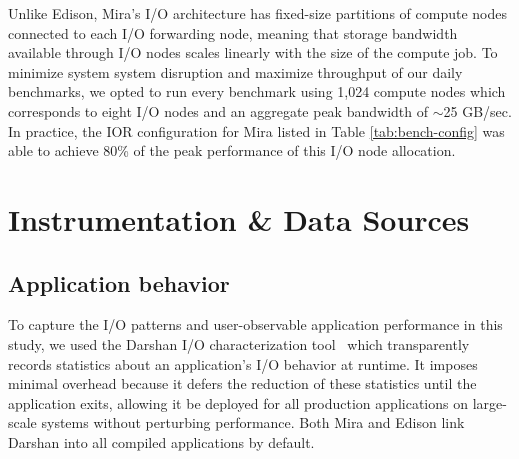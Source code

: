 Unlike Edison, Mira's I/O architecture has fixed-size partitions of compute nodes connected to each I/O forwarding node, 
meaning that storage bandwidth available through I/O nodes scales linearly with the size of the compute job.
To minimize system system disruption and maximize throughput of our daily benchmarks, we opted to run every benchmark using 1,024 compute nodes which 
corresponds to eight I/O nodes and an aggregate peak bandwidth of $\sim$25 GB/sec.
In practice, the IOR configuration for Mira listed in Table \ref{tab:bench-config} was able to achieve 80\% of the peak performance of this I/O node allocation.

\section{Instrumentation \& Data Sources} \label{sec:methods}

\subsection{Application behavior} \label{sec:methods/darshan}

To capture the I/O patterns and user-observable application performance in this study, we used the Darshan I/O characterization tool~\cite{carns200924} which transparently records statistics about an application's I/O behavior at runtime.
It imposes minimal overhead because it defers the reduction of these statistics until the application exits,
allowing it be deployed for all production applications on large-scale systems without perturbing performance.  Both Mira and Edison link Darshan into all compiled applications by default.

